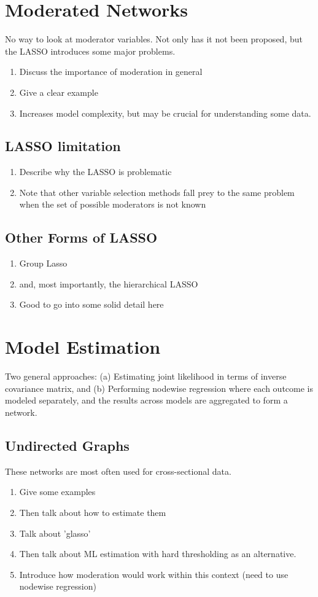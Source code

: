 \section{Moderated Networks}
No way to look at moderator variables. Not only has it not been proposed, but the LASSO introduces some major problems. 
\begin{enumerate}
    \item Discuss the importance of moderation in general
    \item Give a clear example
    \item Increases model complexity, but may be crucial for understanding some data.
\end{enumerate}
\subsection{LASSO limitation}
\begin{enumerate}
    \item Describe why the LASSO is problematic
    \item Note that other variable selection methods fall prey to the same problem when the set of possible moderators is not known
\end{enumerate}
\subsection{Other Forms of LASSO}
\begin{enumerate}
    \item Group Lasso
    \item and, most importantly, the hierarchical LASSO
    \item Good to go into some solid detail here
\end{enumerate}

\section{Model Estimation}
Two general approaches: (a) Estimating joint likelihood in terms of inverse covariance matrix, and (b) Performing nodewise regression where each outcome is modeled separately, and the results across models are aggregated to form a network.
\subsection{Undirected Graphs}
These networks are most often used for cross-sectional data. 
\begin{enumerate}
    \item Give some examples
    \item Then talk about how to estimate them
    \item Talk about 'glasso'
    \item Then talk about ML estimation with hard thresholding as an alternative.
    \item Introduce how moderation would work within this context (need to use nodewise regression)
\end{enumerate}
